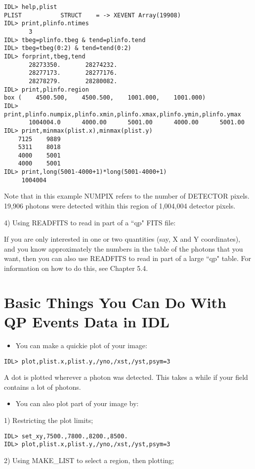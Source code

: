 \medskip\noindent
\begin{verbatim}
IDL> help,plist
PLIST           STRUCT    = -> XEVENT Array(19908)
IDL> print,plinfo.ntimes
       3
IDL> tbeg=plinfo.tbeg & tend=plinfo.tend
IDL> tbeg=tbeg(0:2) & tend=tend(0:2)
IDL> forprint,tbeg,tend
       28273350.       28274232.
       28277173.       28277176.
       28278279.       28280082.
IDL> print,plinfo.region
box (    4500.500,    4500.500,    1001.000,    1001.000)
IDL> print,plinfo.numpix,plinfo.xmin,plinfo.xmax,plinfo.ymin,plinfo.ymax
       1004004.0      4000.00      5001.00      4000.00      5001.00
IDL> print,minmax(plist.x),minmax(plist.y)
    7125    9889
    5311    8018
    4000    5001
    4000    5001
IDL> print,long(5001-4000+1)*long(5001-4000+1)
     1004004
\end{verbatim}
Note that in this example NUMPIX refers to the number of DETECTOR pixels.
19,906 photons were detected within this region of 1,004,004 detector pixels.
 
4) Using READFITS to read in part of a ``qp" FITS file:
 
If you are only interested in one or two quantities (say, X and Y
coordinates), and you know approximately the numbers in the table of the
photons that you want, then you can also use READFITS to read in part of a
large ``qp" table. For information on how to do this, see Chapter 5.4.
 
\chapter{Basic Things You Can Do With QP Events Data in IDL }
 

\begin{itemize}
\item  You can make a quickie plot of your image:
\end{itemize}

\medskip\noindent
\begin{verbatim}
IDL> plot,plist.x,plist.y,/yno,/xst,/yst,psym=3
\end{verbatim}
A dot is plotted wherever a photon was detected. This takes a while if your
field contains a lot of photons.

\begin{itemize}
\item  You can also plot part of your image by:
\end{itemize}
1) Restricting the plot limits;

\medskip\noindent
\begin{verbatim}
IDL> set_xy,7500.,7800.,8200.,8500.
IDL> plot,plist.x,plist.y,/yno,/xst,/yst,psym=3
\end{verbatim}
2) Using MAKE{\_}LIST to select a region, then plotting;
 
